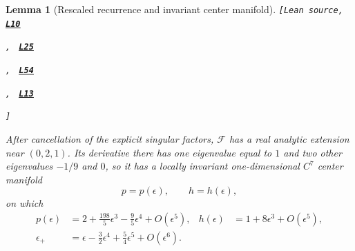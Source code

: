 \documentclass[11pt]{article}
\newtheorem{lemma}[theorem]{Lemma}
\newcommand{\leanLinkText}[1]{%
  \underline{\textbf{#1}}%
}
\newcommand{\leanSnapshot}{e308927f5b7930bdd002f0c0e42b9d112ad821cb}
\newcommand{\leanDeclTag}[2]{%
  {\footnotesize\texttt{[Lean source, }}%
  \href{https://github.com/imathwy/DFP_wolfe_local/blob/\leanSnapshot/#1?plain=1\#L#2}%
    {\leanLinkText{\footnotesize\texttt{L#2}}}%
}
\newcommand{\leanDeclTagExtra}[2]{%
  \unskip
  {\footnotesize\texttt{, }}%
  \href{https://github.com/imathwy/DFP_wolfe_local/blob/\leanSnapshot/#1?plain=1\#L#2}%
    {\leanLinkText{\footnotesize\texttt{L#2}}}\allowbreak
}
\newcommand{\leanDeclTagEnd}{%
  \unskip
  {\footnotesize\texttt{]}}\enspace
}
\begin{document}
\begin{lemma}[Rescaled recurrence and invariant center manifold]
\label{lem:center-manifold}
\leanDeclTag{DFPWolfe/A_uniformly_convex_counterexample_to_global_convergence_of_DFP_under_weak_Wolfe_/Lemma_Blown_up_map_and_invariant_slow_curve.lean}{10}
\leanDeclTagExtra{DFPWolfe/A_uniformly_convex_counterexample_to_global_convergence_of_DFP_under_weak_Wolfe_/Lemma_Blown_up_map_and_invariant_slow_curve.lean}{25}
\leanDeclTagExtra{DFPWolfe/A_uniformly_convex_counterexample_to_global_convergence_of_DFP_under_weak_Wolfe_/Lemma_Blown_up_map_and_invariant_slow_curve.lean}{54}
\leanDeclTagExtra{DFPWolfe/A_uniformly_convex_counterexample_to_global_convergence_of_DFP_under_weak_Wolfe_/Lemma_3_18_Parabolic_center_recurrence.lean}{13}
\leanDeclTagEnd
After cancellation of the explicit singular factors, $\mathcal F$ has a real
analytic extension near $(0,2,1)$.  Its derivative there has one eigenvalue
equal to $1$ and two other eigenvalues
$-1/9$ and $0$, so it has a
locally invariant one-dimensional $C^7$ center manifold
\[
p=p(\epsilon),\qquad h=h(\epsilon),
\]
on which
\begin{align}
p(\epsilon)&=2+\frac{198}{5}\epsilon^3
-\frac95\epsilon^4+O(\epsilon^5),
&h(\epsilon)&=1+8\epsilon^3+O(\epsilon^5),
\label{eq:center-curve}\\
\epsilon_+&=\epsilon-\frac32\epsilon^4
+\frac54\epsilon^5+O(\epsilon^6).
\label{eq:epsilon-map}
\end{align}
\end{lemma}
\end{document}
